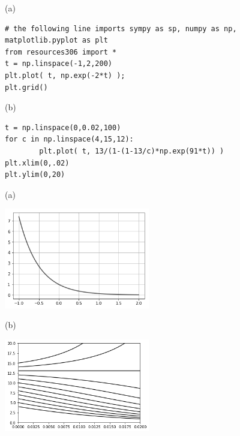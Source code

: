 \documentclass[12pt]{book}
\begin{document}
\noindent (a) 
\begin{small}
\begin{verbatim}
# the following line imports sympy as sp, numpy as np, matplotlib.pyplot as plt
from resources306 import *
t = np.linspace(-1,2,200)
plt.plot( t, np.exp(-2*t) );
plt.grid()
\end{verbatim}
\end{small}

\noindent (b)
\begin{small}
\begin{verbatim}
t = np.linspace(0,0.02,100)
for c in np.linspace(4,15,12):
        plt.plot( t, 13/(1-(1-13/c)*np.exp(91*t)) )
plt.xlim(0,.02)
plt.ylim(0,20)
\end{verbatim}
\end{small}


(a)\parbox[c]{2.6in}{\includegraphics[width=2.5in]{additional_figures/Introduction_to_differential_equations__single_curve}}
(b)\parbox[c]{2.6in}{\includegraphics[width=2.5in]{additional_figures/Introduction_to_differential_equations__family_of_curves}}
\newpage  %
\end{document}
